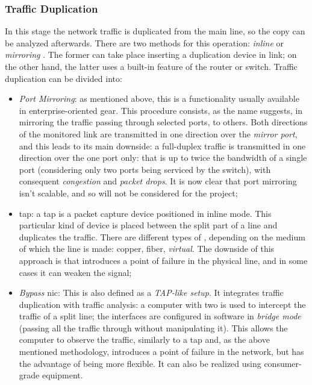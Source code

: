 \subsubsection{Traffic Duplication}
\label{subsubsec:traffic-duplication}

In this stage the network traffic is duplicated from the main line, so the copy can be analyzed afterwards. There are two methods for this operation: \textit{inline} or \textit{mirroring} \cite{Svoboda2015}. The former can take place inserting a duplication device in link; on the other hand, the latter uses a built-in feature of the router or switch. Traffic duplication can be divided into:
\begin{itemize}
    \item[\faCaretRight] \textit{Port Mirroring}: as mentioned above, this is a functionality usually available in enterprise-oriented gear. This procedure consists, as the name suggests, in mirroring the traffic passing through selected ports, to others. Both directions of the monitored link are transmitted in one direction over the \textit{mirror port}, and this leads to its main downside: a full-duplex traffic is transmitted in one direction over the one port only: that is up to twice the bandwidth of a single port (considering only two ports being serviced by the switch), with consequent \textit{congestion} and \textit{packet drops}. It is now clear that port mirroring isn't scalable, and so will not be considered for the project;
    \item[\faCaretRight] \gls{tap}: a \gls{tap} is a packet capture device positioned in inline mode. This particular kind of device is placed between the split part of a line and duplicates the traffic. There are different types of , depending on the medium of which the line is made: copper, fiber, \textit{virtual}. The downside of this approach is that introduces a point of failure in the physical line, and in some cases it can weaken the signal;
    \item[\faCaretRight] \textit{Bypass} \gls{nic}: This is also defined as a \textit{TAP-like setup}. It integrates traffic duplication with traffic analysis: a computer with two  is used to intercept the traffic of a split line; the interfaces are configured in software in \textit{bridge mode} (passing all the traffic through without manipulating it). This allows the computer to observe the traffic, similarly to a \gls{tap} and, as the above mentioned methodology, introduces a point of failure in the network, but has the advantage of being more flexible. It can also be realized using consumer-grade equipment.
\end{itemize}

